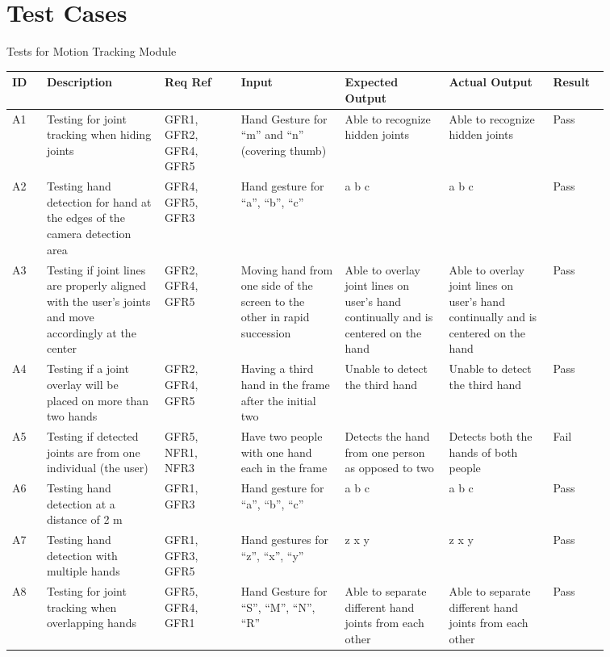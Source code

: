 \documentclass[12pt, titlepage]{article}
\begin{document}
\newpage
\section{Test Cases}
\centerline{Tests for Motion Tracking Module}

\renewcommand{\arraystretch}{1.2}
\noindent \begin{longtable}{p{0.05\linewidth}|p{0.17\linewidth}|p{0.11\linewidth}|p{0.15\linewidth}|p{0.15\linewidth}|p{0.15\linewidth}|p{0.08\linewidth}}
\hline
\textbf{ID} & \textbf{Description} & \textbf{Req Ref} & \textbf{Input} & \textbf{Expected Output} & \textbf{Actual Output} & \textbf{Result}\\
\hline
A1 & Testing for joint tracking when hiding joints & GFR1, GFR2, GFR4, GFR5 & Hand Gesture for “m” and “n” (covering thumb) & Able to recognize hidden joints & Able to recognize hidden joints & Pass\\ \hline
A2 & Testing hand detection for hand at the edges of the camera detection area & GFR4, GFR5, GFR3 & Hand gesture for “a”, “b”, “c” & a b c & a b c & Pass\\ \hline
A3 & Testing if joint lines are properly aligned with the user’s joints and move accordingly at the center & GFR2, GFR4, GFR5 & Moving hand from one side of the screen to the other in rapid succession & Able to overlay joint lines on user’s hand continually and is centered on the hand & Able to overlay joint lines on user’s hand continually and is centered on the hand & Pass\\ \hline
A4 & Testing if a joint overlay will be placed on more than two hands & GFR2, GFR4, GFR5 & Having a third hand in the frame after the initial two & Unable to detect the third hand & Unable to detect the third hand & Pass\\ \hline
A5 & Testing if detected joints are from one individual (the user) & GFR5, NFR1, NFR3 & Have two people with one hand each in the frame & Detects the hand from one person as opposed to two & Detects both the hands of both people & Fail\\ \hline
A6 & Testing hand detection at a distance of 2 m & GFR1, GFR3 & Hand gesture for “a”, “b”, “c” & a b c & a b c & Pass\\ \hline
A7 & Testing hand detection with multiple hands & GFR1, GFR3, GFR5 & Hand gestures for “z”, “x”, “y” & z x y & z x y & Pass\\ \hline
A8 & Testing for joint tracking when overlapping hands & GFR5, GFR4, GFR1 & Hand Gesture for “S”, “M”, “N”, “R” & Able to separate different hand joints from each other & Able to separate different hand joints from each other & Pass\\ \hline

\end{longtable}
\end{document}
